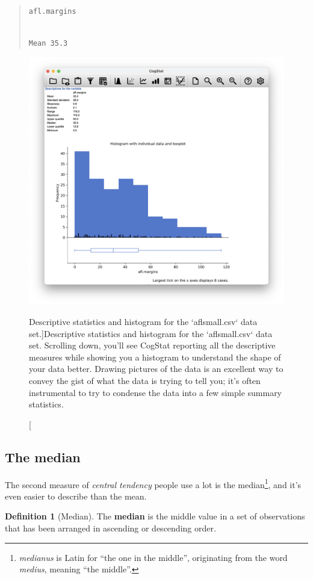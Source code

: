 \documentclass[
]{book}
\theoremstyle{definition}
\newtheorem{definition}{Definition}[chapter]
\theoremstyle{definition}
\theoremstyle{definition}
\theoremstyle{definition}
\theoremstyle{remark}
\begin{document}
\begin{quote}
\texttt{afl.margins}\strut \\
\texttt{Mean\ 35.3}
\end{quote}

\begin{figure}

{\centering \includegraphics[width=0.66\linewidth]{resources/image/cogstathistogramaflsmall} 

}

\caption[Descriptive statistics and histogram for the `aflsmall.csv` data set.]{Descriptive statistics and histogram for the `aflsmall.csv` data set. Scrolling down, you'll see CogStat reporting all the descriptive measures while showing you a histogram to understand the shape of your data better. Drawing pictures of the data is an excellent way to convey the gist of what the data is trying to tell you; it's often instrumental to try to condense the data into a few simple summary statistics.}\label{fig:histogramaflsmall}
\end{figure}

\hypertarget{median}{%
\subsection{The median}\label{median}}

The second measure of \emph{central tendency} people use a lot is the median\footnote{\emph{medianus} is Latin for ``the one in the middle'', originating from the word \emph{medius}, meaning ``the middle''.}, and it's even easier to describe than the mean.

\begin{definition}[Median]
\protect\hypertarget{def:defmedian}{}\label{def:defmedian}The \textbf{median} is the middle value in a set of observations that has been arranged in ascending or descending order.
\end{definition}
\end{document}

